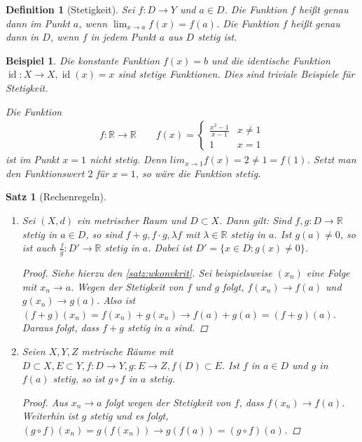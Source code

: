 \documentclass[ngerman,titlepage,twoside, parskip=half*]{scrreprt}
\newcommand*{\R}{\mathbb{R}}
\theoremstyle{break}
\newtheorem{theorem}{Satz}[section]
\newtheorem{definition}{Definition}[chapter]
\theoremstyle{nonumberbreak}
\newtheorem{beispiel}{Beispiel}
\newtheorem{proof}{Beweis:}
\newcommand*{\highl}[2][]{\textbf{\boldmath{#2}}%
  \ifthenelse{\equal{#1}{}}{\index{#2}}{\index{#1}}%
}
\DeclareMathOperator{\id}{id}
\begin{document}
\begin{definition}[Stetigkeit]
Sei $f\colon D\rightarrow Y$ und $a \in D$. Die Funktion $f$ heißt genau dann
  \highl{stetig} im Punkt $a$, wenn $\lim_{x\rightarrow a}
  f(x)=f(a)$. Die Funktion $f$ heißt genau dann
  \highl{stetig} in $D$, wenn $f$ in jedem Punkt
  $a$ aus $D$ stetig ist.
\end{definition}

\begin{beispiel}
  Die konstante Funktion $f(x)=b$ und die identische Funktion $\id\colon
  X\rightarrow X, \id(x)=x$ sind stetige Funktionen. Dies sind triviale
  Beispiele für Stetigkeit.

  Die Funktion
  \begin{gather*}
    f\colon\R\rightarrow \R\qquad f(x)=\begin{cases}\frac{x^2-1}{x-1} & x \neq
					 1\\1 & x=1\end{cases}
  \end{gather*}
  ist im Punkt $x=1$ \emph{nicht} stetig. Denn $lim_{x\rightarrow 1}f(x)=2\neq
  1=f(1)$. Setzt man den Funktionswert $2$ für $x=1$, so wäre die Funktion
  stetig.
\end{beispiel}

\begin{theorem}[Rechenregeln]
\begin{enumerate}[(1)]
  \item Sei $(X,d)$ ein metrischer Raum und $D \subset X$. Dann gilt: Sind
  $f,g\colon D\rightarrow\R$ stetig in $a \in D$, so sind $f+g, f\cdot g,
  \lambda f$ mit $\lambda \in \R$ stetig in $a$. Ist $g(a)\neq 0$, so ist auch
  $\frac{f}{g}\colon D'\rightarrow \R$ stetig in $a$. Dabei ist $D'=\{x\in
  D\colon g(x)\neq 0\}$.
  \begin{proof}
    Siehe hierzu den \autoref{satz:wkonvkrit}. Sei beispielsweise $(x_n)$ eine
    Folge mit $x_n\rightarrow a$. Wegen der Stetigkeit von $f$ und $g$ folgt,
    $f(x_n)\rightarrow f(a)$ und $g(x_n)\rightarrow g(a)$. Also ist
    $(f+g)(x_n)=f(x_n)+g(x_n)\rightarrow f(a)+g(a)=(f+g)(a)$.
    Daraus folgt, dass $f+g$ stetig in $a$ sind.
  \end{proof}
  \item Seien $X,Y,Z$ metrische Räume mit $D\subset X, E\subset Y, f\colon
  D\rightarrow Y, g\colon E\rightarrow Z, f(D)\subset E$. Ist $f$ in $a\in D$
  und $g$ in $f(a)$ stetig, so ist $g\circ f$ in $a$ stetig.
  \begin{proof}
    Aus $x_n\rightarrow a$ folgt wegen der Stetigkeit von $f$, dass
    $f(x_n)\rightarrow f(a)$. Weiterhin ist $g$ stetig und es folgt, $(g \circ
    f)(x_n)=g(f(x_n))\rightarrow g(f(a))=(g\circ f) (a)$.
  \end{proof}
\end{enumerate}
\end{theorem}
\end{document}
